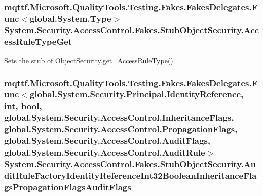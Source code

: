 \hypertarget{class_system_1_1_security_1_1_access_control_1_1_fakes_1_1_stub_object_security_ad6b1c178422b079da886179bd5aff2ff}{
\subsubsection[{Access\-Rule\-Type\-Get}]{\setlength{\rightskip}{0pt plus 5cm}mqttf.\-Microsoft.\-Quality\-Tools.\-Testing.\-Fakes.\-Fakes\-Delegates.\-Func$<$global.\-System.\-Type$>$ System.\-Security.\-Access\-Control.\-Fakes.\-Stub\-Object\-Security.\-Access\-Rule\-Type\-Get}}\label{class_system_1_1_security_1_1_access_control_1_1_fakes_1_1_stub_object_security_ad6b1c178422b079da886179bd5aff2ff}


Sets the stub of Object\-Security.\-get\-\_\-\-Access\-Rule\-Type()

\hypertarget{class_system_1_1_security_1_1_access_control_1_1_fakes_1_1_stub_object_security_a3347e93a98b76fad6186979b699fc956}{
\subsubsection[{Audit\-Rule\-Factory\-Identity\-Reference\-Int32\-Boolean\-Inheritance\-Flags\-Propagation\-Flags\-Audit\-Flags}]{\setlength{\rightskip}{0pt plus 5cm}mqttf.\-Microsoft.\-Quality\-Tools.\-Testing.\-Fakes.\-Fakes\-Delegates.\-Func$<$global.\-System.\-Security.\-Principal.\-Identity\-Reference, int, bool, global.\-System.\-Security.\-Access\-Control.\-Inheritance\-Flags, global.\-System.\-Security.\-Access\-Control.\-Propagation\-Flags, global.\-System.\-Security.\-Access\-Control.\-Audit\-Flags, global.\-System.\-Security.\-Access\-Control.\-Audit\-Rule$>$ System.\-Security.\-Access\-Control.\-Fakes.\-Stub\-Object\-Security.\-Audit\-Rule\-Factory\-Identity\-Reference\-Int32\-Boolean\-Inheritance\-Flags\-Propagation\-Flags\-Audit\-Flags}}\label{class_system_1_1_security_1_1_access_control_1_1_fakes_1_1_stub_object_security_a3347e93a98b76fad6186979b699fc956}


